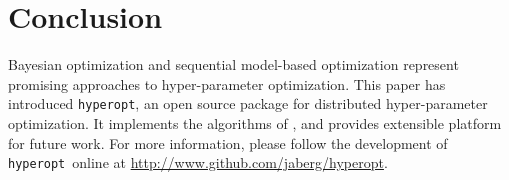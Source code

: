 \documentclass{article}
\newcommand{\hyperopt}{{\tt hyperopt}}
\begin{document}
\section{Conclusion}

Bayesian optimization and sequential model-based optimization represent
promising approaches to hyper-parameter optimization.
This paper has introduced \hyperopt, an open source package for
distributed hyper-parameter
optimization. It implements the algorithms of \cite{nipspaper},
and provides extensible platform for future work.
For more information, please follow the development of \hyperopt\ online at
\url{http://www.github.com/jaberg/hyperopt}.

\newpage
\small


\end{document}

